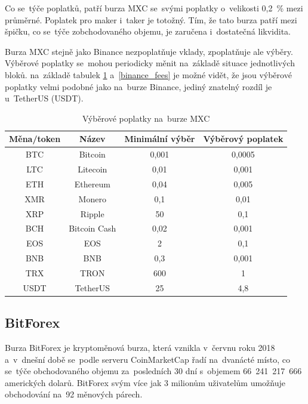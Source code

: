 \documentclass[thesis=B,czech]{FITthesis}[2019/03/21]
\begin{document}
Co se~týče poplatků, patří burza MXC se~svými poplatky o~velikosti 0,2~\% mezi průměrné. Poplatek pro maker i~taker je totožný. Tím, že tato burza patří mezi špičku, co se~týče zobchodovaného objemu, je zaručena i~dostatečná likvidita. \cite{cryptowisser_mxc} 

Burza MXC stejně jako Binance nezpoplatňuje vklady, zpoplatňuje ale výběry. Výběrové poplatky se~mohou periodicky měnit na~základě situace jednotlivých bloků. \cite{mxc_fees} na~základě tabulek \ref{mxc_fees} a~\ref{binance_fees} je možné vidět, že jsou výběrové poplatky velmi podobné jako na~burze Binance, jediný znatelný rozdíl je u~TetherUS (USDT). \cite{cryptowisser_mxc}

\begin{table}\centering
    \caption{Výběrové poplatky na~burze MXC \cite{mxc_fees}}
    \label{mxc_fees}
     \begin{tabular}{||c | c | c | c||} 
     \hline
     Měna/token & Název & Minimální výběr & Výběrový poplatek \\ [0.5ex] 
     \hline\hline
     BTC & Bitcoin & 0,001 & 0,0005 \\ 
     \hline
     LTC & Litecoin & 0,01 & 0,001 \\
     \hline
     ETH & Ethereum & 0,04 & 0,005 \\
     \hline
     XMR & Monero & 0,1 & 0,01 \\
     \hline
     XRP & Ripple & 50 & 0,1 \\
     \hline
     BCH & Bitcoin Cash & 0,02 & 0,001 \\
     \hline
     EOS & EOS & 2 & 0,1 \\
     \hline
     BNB & BNB & 0,3 & 0,001 \\
     \hline
     TRX & TRON & 600 & 1 \\
     \hline
     USDT & TetherUS & 25 & 4,8 \\
     \hline
    \end{tabular}
\end{table}

\subsection{BitForex}
Burza BitForex je kryptoměnová burza, která vznikla v~červnu roku 2018 a~v~dnešní době se~podle serveru CoinMarketCap řadí na~dvanácté místo, co se~týče obchodovaného objemu za~posledních 30 dní s~objemem 66~241~217~666 amerických dolarů. \cite{coinmarketcap} BitForex svým více jak 3 milionům uživatelům \linebreak umožňuje obchodování na~92 měnových párech.  \cite{cryptowisser_bitforex}
\end{document}
